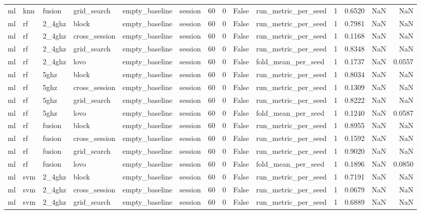 \begin{tabular}{llllllrrrlrrrr}
ml & knn & fusion & grid_search & empty_baseline & session & 60 & 0 & False & run_metric_per_seed & 1 & 0.6520 & NaN & NaN \\
ml & rf & 2_4ghz & block & empty_baseline & session & 60 & 0 & False & run_metric_per_seed & 1 & 0.7981 & NaN & NaN \\
ml & rf & 2_4ghz & cross_session & empty_baseline & session & 60 & 0 & False & run_metric_per_seed & 1 & 0.1168 & NaN & NaN \\
ml & rf & 2_4ghz & grid_search & empty_baseline & session & 60 & 0 & False & run_metric_per_seed & 1 & 0.8348 & NaN & NaN \\
ml & rf & 2_4ghz & lovo & empty_baseline & session & 60 & 0 & False & fold_mean_per_seed & 1 & 0.1737 & NaN & 0.0557 \\
ml & rf & 5ghz & block & empty_baseline & session & 60 & 0 & False & run_metric_per_seed & 1 & 0.8034 & NaN & NaN \\
ml & rf & 5ghz & cross_session & empty_baseline & session & 60 & 0 & False & run_metric_per_seed & 1 & 0.1309 & NaN & NaN \\
ml & rf & 5ghz & grid_search & empty_baseline & session & 60 & 0 & False & run_metric_per_seed & 1 & 0.8222 & NaN & NaN \\
ml & rf & 5ghz & lovo & empty_baseline & session & 60 & 0 & False & fold_mean_per_seed & 1 & 0.1240 & NaN & 0.0587 \\
ml & rf & fusion & block & empty_baseline & session & 60 & 0 & False & run_metric_per_seed & 1 & 0.8955 & NaN & NaN \\
ml & rf & fusion & cross_session & empty_baseline & session & 60 & 0 & False & run_metric_per_seed & 1 & 0.1592 & NaN & NaN \\
ml & rf & fusion & grid_search & empty_baseline & session & 60 & 0 & False & run_metric_per_seed & 1 & 0.9020 & NaN & NaN \\
ml & rf & fusion & lovo & empty_baseline & session & 60 & 0 & False & fold_mean_per_seed & 1 & 0.1896 & NaN & 0.0850 \\
ml & svm & 2_4ghz & block & empty_baseline & session & 60 & 0 & False & run_metric_per_seed & 1 & 0.7191 & NaN & NaN \\
ml & svm & 2_4ghz & cross_session & empty_baseline & session & 60 & 0 & False & run_metric_per_seed & 1 & 0.0679 & NaN & NaN \\
ml & svm & 2_4ghz & grid_search & empty_baseline & session & 60 & 0 & False & run_metric_per_seed & 1 & 0.6889 & NaN & NaN \\

\end{tabular}
